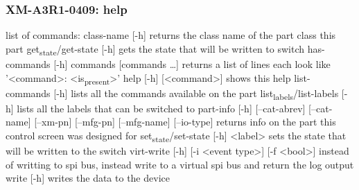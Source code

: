 \documentclass[11pt]{article}
\begin{document}
\subsubsection{XM-A3R1-0409: help}
\label{sec:org0ef17b3}
list of commands:
  class-name [-h]
    returns the class name of the part class this part
  get\textsubscript{state}/get-state [-h]
    gets the state that will be written to switch
  has-commands [-h] commands [commands \ldots{}]
    returns a list of lines each look like '<command>: <is\textsubscript{present}>'
  help [-h] [<command>]
    shows this help
  list-commands [-h]
    lists all the commands available on the part
  list\textsubscript{labels}/list-labels [-h]
    lists all the labels that can be switched to
  part-info  [-h] [--cat-abrev] [--cat-name] [--xm-pn] [--mfg-pn] [--mfg-name]
          [--io-type]
    returns info on the part this control screen was designed for
  set\textsubscript{state}/set-state [-h] <label>
    sets the state that will be written to the switch
  virt-write [-h] [-i <event type>] [-f <bool>]
    instead of writting to spi bus, instead write to a virtual spi bus
    and return the log output
  write [-h]
    writes the data to the device
\end{document}
